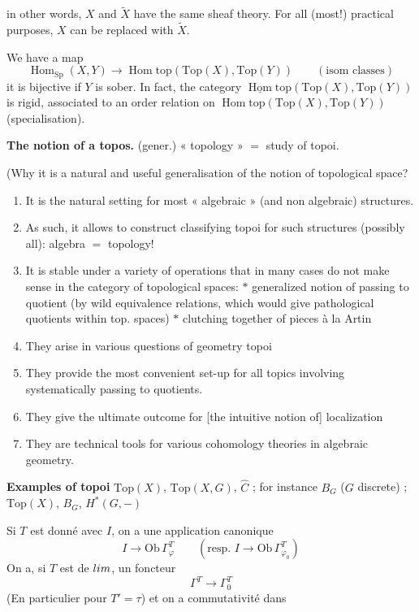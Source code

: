 \documentclass[11pt,a4paper]{article}
\begin{document}
in other words, $X$ and $\widetilde{X}$ have the same sheaf theory. For all
(most!) practical purposes, $X$ can be replaced with $\widetilde{X}$.

We have a map
\[
\operatorname{Hom}_{\mathrm{Sp}}(X, Y) \longrightarrow
\operatorname{Hom}\mathrm{top}(\mathrm{Top}(X), \mathrm{Top}(Y))
\qquad (\text{isom classes})
\]
it is bijective if $Y$ is sober. In fact, the category
$\underline{\operatorname{Hom}}\mathrm{top}(\mathrm{Top}(X), \mathrm{Top}(Y))$ is
 rigid, associated to an order relation on
$\operatorname{Hom}\mathrm{top}(\mathrm{Top}(X), \mathrm{Top}(Y))$
(specialisation).



\textbf{The notion of a topos.} \quad (gener.) « topology » $=$ study of topoi.

(Why it is a natural and useful generalisation of the notion of topological
space?
\begin{enumerate}
\item[a)] It is the natural setting for most « algebraic » (and non algebraic)
structures.
\item[b)] As such, it allows to construct classifying topoi for such structures
(possibly all): algebra $=$ topology!
\item[c)] It is stable under a variety of operations that in many cases do not
make sense in the category of topological spaces:
$*$ generalized notion of passing to quotient (by wild equivalence relations,
which would give pathological quotients within top. spaces)
$*$ clutching together of pieces à la Artin
\item[d)] They arise in various questions of geometry  topoi
\item[e)] They provide the most convenient set-up for all topics involving
systematically passing to quotients.
\item[f)] They give the ultimate outcome for [the intuitive notion of]
localization
\item[g)] They are technical tools for various cohomology theories in algebraic
geometry.
\end{enumerate}

\textbf{Examples of topoi} \quad $\mathrm{Top}(X)$, $\mathrm{Top}(X, G)$,
$\widehat{C}$ ; for instance $B_{G}$ ($G$ discrete) ;
$\mathrm{Top}(X)$, $B_{G}$, $H^{*}(G, -)$


Si $T$ est donné avec $I$, on a une application canonique
\[
I \longrightarrow \mathrm{Ob}\,\Gamma^{T}_{\varphi} \qquad
(\text{resp. } I \to \mathrm{Ob}\,\Gamma^{T}_{\varphi_{0}})
\]
On a, si $T$ est de $\varprojlim$, un foncteur
\[
\Gamma^{T} \longrightarrow \Gamma_{0}^{T}
\]
(En particulier \ill{} pour $T' = \tau$) et on a commutativité dans
\end{document}
